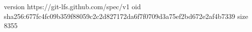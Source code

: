 version https://git-lfs.github.com/spec/v1
oid sha256:677fc4fc09b359f88059c2c2d827172da6f7f0709d3a75ef2bd672e2af4b7339
size 8355
